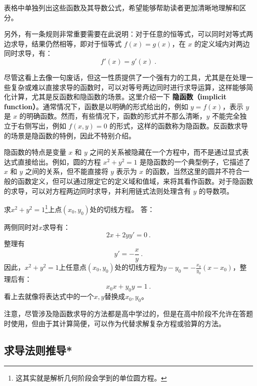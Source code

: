 表格中单独列出这些函数及其导数公式，希望能够帮助读者更加清晰地理解和区分。

另外，有一条规则非常重要需要在此说明：对于任意的恒等式，可以同时对等式两边求导，结果仍然相等，即对于恒等式 $f(x) = g(x)$，在 $x$ 的定义域内对两边同时求导，有：
\begin{equation}
f'(x) = g'(x)~.
\end{equation}

尽管这看上去像一句废话，但这一性质提供了一个强有力的工具，尤其是在处理一些复杂或难以直接求导的函数时，可以对等号两边同时进行求导运算，这样能够简化计算，尤其是反函数和隐函数的场景。这里介绍一下 \textbf{隐函数（implicit function）}。通常情况下，函数是以明确的形式给出的，例如 $y = f(x)$，表示 $y$ 是 $x$ 的明确函数。然而，有些情况下，函数的形式并不那么清晰，$y$ 不能完全独立于右侧写出，例如 $f(x, y) = 0$ 的形式，这样的函数称为隐函数。反函数求导的场景是隐函数的特例，因此不特别介绍。

隐函数的特点是变量 $x$ 和 $y$ 之间的关系被隐藏在一个方程中，而不是通过显式表达式直接给出。例如，圆的方程 $x^2 + y^2 = 1$ 是隐函数的一个典型例子，它描述了 $x$ 和 $y$ 之间的关系，但不能直接将 $y$ 表示为 $x$ 的函数，当然这里的圆并不符合一般的函数定义，但可以通过限定它的定义域和值域，来将其看作函数。对于隐函数的求导，可以对方程两边同时求导，并利用链式法则处理含有 $y$ 的导数项。

\begin{example}{求$x^2 + y^2 = 1$\footnote{这其实就是解析几何阶段会学到的单位圆方程。}上点$(x_0,y_0)$处的切线方程。}
答：

两侧同时对$x$求导有：
\begin{equation}
2x+2yy'=0~.
\end{equation}
整理有\begin{equation}
y'=-\frac{x}{y}~.
\end{equation}
因此，$x^2 + y^2 = 1$上任意点$(x_0,y_0)$处的切线方程为$\displaystyle y-y_0=-\frac{x_0}{y_0}(x-x_0)$，整理后有：
\begin{equation}
x_0x+y_0y=1~.
\end{equation}
看上去就像将表达式中的一个$x,y$替换成$x_0,y_0$。
\end{example}
注意，尽管涉及隐函数求导的方法都是高中学过的，但是在高中阶段不允许在答题时使用，但由于其计算简便，可以作为代替求解复杂方程或验算的方法。

\subsection{求导法则推导*}

